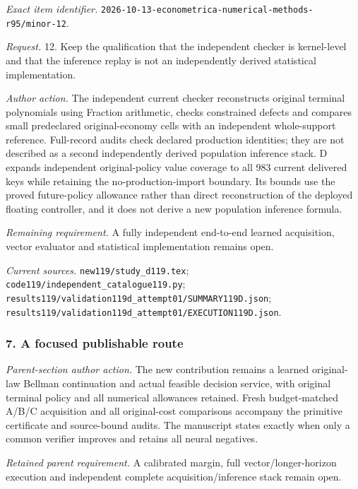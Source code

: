 \emph{Exact item identifier.} \nolinkurl{2026-10-13-econometrica-numerical-methods-r95/minor-12}.

\par\emph{Request.} 12. Keep the qualification that the independent checker is kernel-level and that the inference replay is not an independently derived statistical implementation.

\par\emph{Author action.} The independent current checker reconstructs original terminal polynomials using Fraction arithmetic, checks constrained defects and compares small predeclared original-economy cells with an independent whole-support reference. Full-record audits check declared production identities; they are not described as a second independently derived population inference stack. D expands independent original-policy value coverage to all 983 current delivered keys while retaining the no-production-import boundary. Its bounds use the proved future-policy allowance rather than direct reconstruction of the deployed floating controller, and it does not derive a new population inference formula.

\par\emph{Remaining requirement.} A fully independent end-to-end learned acquisition, vector evaluator and statistical implementation remains open.

\par\emph{Current sources.} \nolinkurl{new119/study_d119.tex}; \nolinkurl{code119/independent_catalogue119.py}; \nolinkurl{results119/validation119d_attempt01/SUMMARY119D.json}; \nolinkurl{results119/validation119d_attempt01/EXECUTION119D.json}.

\subsubsection{7. A focused publishable route}

\emph{Parent-section author action.} The new contribution remains a learned original-law Bellman continuation and actual feasible decision service, with original terminal policy and all numerical allowances retained. Fresh budget-matched A/\allowbreak{}B/\allowbreak{}C acquisition and all original-cost comparisons accompany the primitive certificate and source-bound audits. The manuscript states exactly when only a common verifier improves and retains all neural negatives.

\par\emph{Retained parent requirement.} A calibrated margin, full vector/\allowbreak{}longer-horizon execution and independent complete acquisition/\allowbreak{}inference stack remain open.

